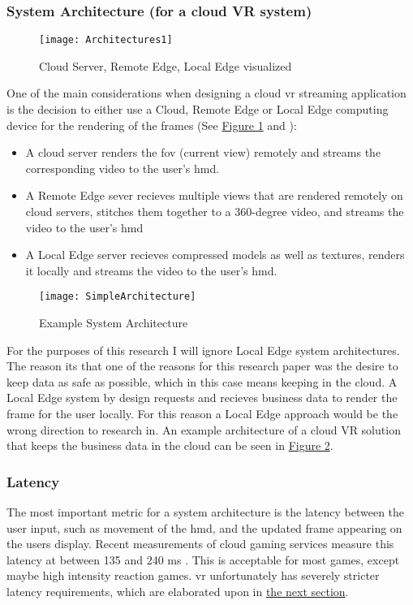 \subsubsection{System Architecture (for a cloud VR system)}
\begin{figure}[h]
\caption{Cloud Server, Remote Edge, Local Edge visualized \parencite{wlanvr}}
\label{fig:arch1}
\texttt{[image: Architectures1]}
\end{figure}

One of the main considerations when designing a cloud \acrshort{vr} streaming application is the decision to either use a Cloud, Remote Edge or Local Edge computing device for the rendering of the frames (See \hyperref[fig:arch1]{Figure 1} and \cite{wlanvr}):
\begin{itemize}
\item A cloud server renders the \acrfull{fov} (current view) remotely and streams the corresponding video to the user’s \acrfull{hmd}. 
\item A Remote Edge sever recieves multiple views that are rendered remotely on cloud servers, stitches them together to a 360-degree video, and streams the video to the user’s \acrshort{hmd}
\item A Local Edge server recieves compressed models as well as textures, renders it locally and streams the video to the user’s \acrshort{hmd}.
\end{itemize} 

\begin{figure}[!htbp]
\caption{Example System Architecture}
\label{fig:sysarch}
\texttt{[image: SimpleArchitecture]}
\end{figure}

For the purposes of this research I will ignore Local Edge system architectures. The reason its that one of the reasons for this research paper was the desire to keep data as safe as possible, which in this case means keeping in the cloud. A Local Edge system by design requests and recieves business data to render the frame for the user locally. For this reason a Local Edge approach would be the wrong direction to research in. An example architecture of a cloud VR solution that keeps the business data in the cloud can be seen in \hyperref[fig:sysarch]{Figure 2}.
\subsubsection{Latency}
The most important metric for a system architecture is the latency between the user input, such as movement of the \acrshort{hmd}, and the updated frame appearing on the users display. Recent measurements of  cloud gaming services measure this latency at between 135 and 240 \acrshort{ms} \parencite{lagmeasure}. This is acceptable for most games, except maybe high intensity reaction games. \acrshort{vr} unfortunately has severely stricter latency requirements, which are elaborated upon in \hyperref[ssec:vrphy]{the next section}.

